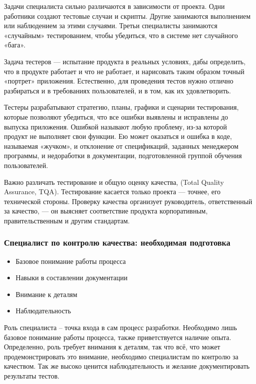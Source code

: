 \documentclass{../industrial-development}
\begin{document}
\lecturenotes

Задачи специалиста сильно различаются в зависимости от проекта. Одни работники создают тестовые случаи и скрипты. Другие занимаются выполнением или наблюдением за этими случаями. Третьи специалисты занимаются «случайным» тестированием, чтобы убедиться, что в системе нет случайного «бага».   ~\cite{Anatomy}

Задача тестеров — испытание продукта в реальных условиях, дабы
определить, что в продукте работает и что не работает, и нарисовать таким образом точный «портрет» приложения. Естественно, для проведения тестов нужно отлично разбираться и в требованиях пользователей, и в том, как их удовлетворить.

Тестеры разрабатывают стратегию, планы, графики и сценарии
тестирования, которые позволяют убедиться, что все ошибки выявлены и исправлены до выпуска приложения. Ошибкой называют любую проблему, из-за которой продукт не выполняет свои функции. Ею может оказаться и ошибка в коде, называемая «жучком», и отклонение от спецификаций, заданных менеджером программы, и недоработки в документации, подготовленной группой обучения пользователей.

Важно различать тестирование и общую оценку качества, (Total Quality Assurance, TQA). Тестирование касается только проекта — точнее, его технической стороны. Проверку качества организует руководитель, ответственный за качество, — он выясняет соответствие продукта корпоративным, правительственным и другим стандартам.~\cite{Collective}

\begin{frame} \frametitle{Специалист по контролю качества: необходимая подготовка}
  \begin{itemize}
  \item Базовое понимание работы процесса
  \item Навыки в составлении документации
  \item Внимание к деталям
  \item Наблюдательность 
  \end{itemize}
\end{frame}

\lecturenotes

Роль специалиста – точка входа в сам процесс разработки. Необходимо лишь базовое понимание работы процесса, также приветствуется наличие опыта. 
Определенно, роль требует внимания к деталям, так что всё, что может продемонстрировать это внимание, необходимо специалистам по контролю за качеством. Так же высоко ценится наблюдательность и желание документировать результаты тестов. ~\cite{Anatomy}
\end{document}
